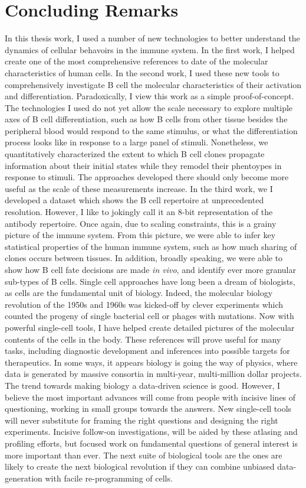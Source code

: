 \chapter{Concluding Remarks}
In this thesis work, I used a number of new technologies to better understand the dynamics of cellular behavoirs in the immune system. In the first work, I helped create one of the most comprehensive references to date of the molecular characteristics of human cells. In the second work, I used these new tools to comprehensively investigate B cell the molecular characteristics of their activation and differentiation. Paradoxically, I view this work as a simple proof-of-concept. The technologies I used do not yet allow the scale necessary to explore multiple axes of B cell differentiation, such as how B cells from other tissue besides the peripheral blood would respond to the same stimulus, or what the differentiation process looks like in response to a large panel of stimuli. Nonetheless, we quantitatively characterized the extent to which B cell clones propagate information about their initial states while they remodel their phentoypes in response to stimuli. The approaches developed there should only become more useful as the scale of these measurements increase. In the third work, we I developed a dataset which shows the B cell repertoire at unprecedented resolution. However, I like to jokingly call it an 8-bit representation of the antibody repertoire. Once again, due to scaling constraints, this is a grainy picture of the immune system. From this picture, we were able to infer key statistical properties of the human immune system, such as how much sharing of clones occurs between tissues. In addition, broadly speaking, we were able to show how B cell fate decisions are made \textit{in vivo}, and identify ever more granular sub-types of B cells.
Single cell approaches have long been a dream of biologists, as cells are the fundamental unit of biology. Indeed, the molecular biology revolution of the 1950s and 1960s was kicked-off by clever experiments which counted the progeny of single bacterial cell or phages with mutations. Now with powerful single-cell tools, I have helped create detailed pictures of the molecular contents of the cells in the body. These references will prove useful for many tasks, including diagnostic development and inferences into possible targets for therapeutics. In some ways, it appears biology is going the way of physics, where data is generated by massive consortia in multi-year, multi-million dollar projects. The trend towards making biology a data-driven science is good. However, I believe the most important advances will come from people with incisive lines of questioning, working in small groups towards the answers. New single-cell tools will never substitute for framing the right questions and designing the right experiments. Incisive follow-on investigations, will be aided by these atlasing and profiling efforts, but focused work on fundamental questions of general interest is more important than ever. The next suite of biological tools are the ones are likely to create the next biological revolution if they can combine unbiased data-generation with facile re-programming of cells.      
